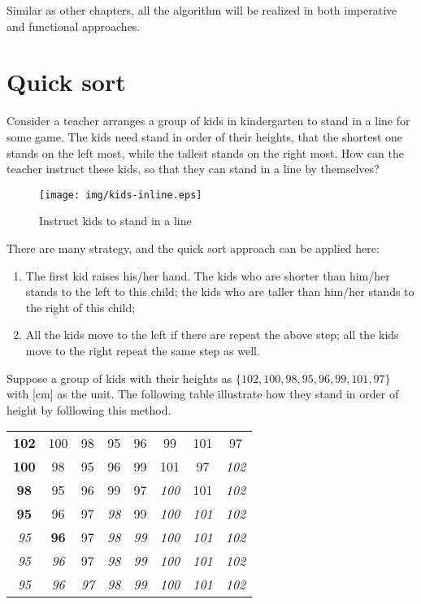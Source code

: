 \documentclass{article}
\begin{document}
Similar as other chapters, all the algorithm will be realized in both imperative and functional approaches.

\section{Quick sort}

Consider a teacher arranges a group of kids in kindergarten to stand in a line for some game.
The kids need stand in order of their heights, that the shortest one stands on the left most,
while the tallest stands on the right most. How can the teacher instruct these kids, so that
they can stand in a line by themselves?

\begin{figure}[htbp]
 \centering
 \texttt{[image: img/kids-inline.eps]}
 \caption{Instruct kids to stand in a line}
 \label{fig:knuth-ssort}
\end{figure}

There are many strategy, and the quick sort approach can be applied here:

\begin{enumerate}
  \item The first kid raises his/her hand. The kids who are shorter than him/her stands to the left to this child; the kids who are taller than him/her stands to the right of this child;
  \item All the kids move to the left if there are repeat the above step; all the kids move to the right repeat the same step as well.
\end{enumerate}

Suppose a group of kids with their heights as $\{102, 100, 98, 95, 96, 99, 101, 97\}$ with [cm] as the unit. 
The following table illustrate how they stand in order of height by folllowing this method.

\begin{tabular}{ | c c c c c c c c |}
\hline
{\bf 102} & 100 & 98 & 95 & 96 & 99 & 101 & 97 \\
{\bf 100} & 98 & 95 & 96 & 99 & 101 & 97 & {\em 102} \\
{\bf 98} & 95 & 96 & 99 & 97 & {\em 100} & 101 & {\em 102} \\
{\bf 95} & 96 & 97 & {\em 98} & 99 & {\em 100} & {\em 101} & {\em 102} \\
{\em 95} & {\bf 96} & 97 & {\em 98} & {\em 99} & {\em 100} & {\em 101} & {\em 102} \\
{\em 95} & {\em 96} & 97 & {\em 98} & {\em 99} & {\em 100} & {\em 101} & {\em 102} \\
{\em 95} & {\em 96} & {\em 97} & {\em 98} & {\em 99} & {\em 100} & {\em 101} & {\em 102} \\
\hline
\end{tabular}
\end{document}

